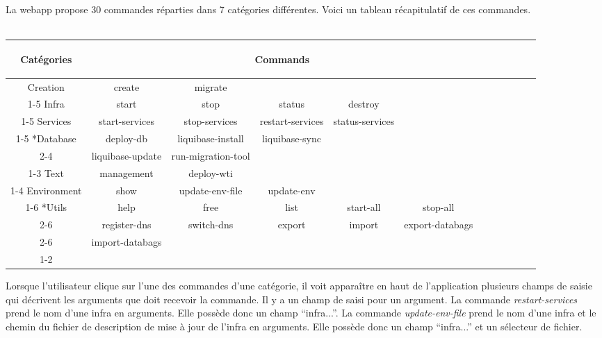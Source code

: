 La webapp propose 30 commandes réparties dans 7 catégories différentes.
Voici un tableau récapitulatif de ces commandes.\\\\
\begin{tabular}{|c|c|c|c|c|c|c|c|c|c|c|c|}
  \hline
  \begin{bf}Catégories\end{bf} & \multicolumn{5}{c|}{\begin{bf}Commands\end{bf}} \\
    \hline
    Creation & create & migrate \\
    \cline{1-5}
    Infra & start & stop & status & destroy \\
    \cline{1-5}
    Services & start-services & stop-services & restart-services & status-services \\
    \cline{1-5}
    \multirow{2}*{Database} & deploy-db & liquibase-install & liquibase-sync\\
    \cline{2-4}
    & liquibase-update & run-migration-tool  \\
    \cline{1-3}
    Text & management & deploy-wti \\
    \cline{1-4}
    Environment & show & update-env-file & update-env \\
    \cline{1-6}
    \multirow{3}*{Utils} & help & free & list & start-all & stop-all \\
    \cline{2-6}
    & register-dns & switch-dns & export & import & export-databags\\
    \cline{2-6}
    & import-databags \\
    \cline{1-2}
\end{tabular}



Lorsque l'utilisateur clique sur l'une des commandes d'une catégorie, il voit
apparaître en haut de l'application plusieurs champs de saisie qui décrivent les
arguments que doit recevoir la commande.
Il y a un champ de saisi pour un argument.
La commande \textit{restart-services} prend le nom d'une infra en
arguments. Elle possède donc un champ ``infra...''.
La commande \textit{update-env-file} prend le nom d'une infra et le chemin du
fichier de description de mise à jour de l'infra en arguments. Elle possède donc
un champ ``infra...'' et un sélecteur de fichier.

